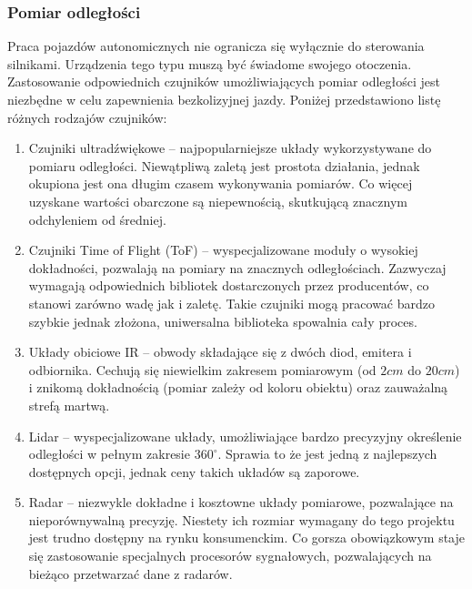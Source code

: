         \subsubsection{Pomiar odległości}
            Praca pojazdów autonomicznych nie ogranicza się wyłącznie do sterowania silnikami.
            Urządzenia tego typu muszą być świadome swojego otoczenia.
            Zastosowanie odpowiednich czujników umożliwiających pomiar odległości jest niezbędne w celu zapewnienia bezkolizyjnej jazdy.
            Poniżej przedstawiono listę różnych rodzajów czujników:
            \begin{enumerate}
                \item Czujniki ultradźwiękowe -- najpopularniejsze układy wykorzystywane do pomiaru odległości.
                Niewątpliwą zaletą jest prostota działania, jednak okupiona jest ona długim czasem wykonywania pomiarów.
                Co więcej uzyskane wartości obarczone są niepewnością, skutkującą znacznym odchyleniem od średniej.
                \item Czujniki Time of Flight (ToF) -- wyspecjalizowane moduły o wysokiej dokładności, pozwalają na pomiary na znacznych odległościach.
                Zazwyczaj wymagają odpowiednich bibliotek dostarczonych przez producentów, co stanowi zarówno wadę jak i zaletę.
                Takie czujniki mogą pracować bardzo szybkie jednak złożona, uniwersalna biblioteka spowalnia cały proces.
                \item Układy obiciowe IR -- obwody składające się z dwóch diod, emitera i odbiornika.
                Cechują się niewielkim zakresem pomiarowym (od $2cm$ do $20cm$) i znikomą dokładnością (pomiar zależy od koloru obiektu) oraz zauważalną strefą martwą.
                \item Lidar -- wyspecjalizowane układy, umożliwiające bardzo precyzyjny określenie odległości w pełnym zakresie $360^\circ$.
                Sprawia to że jest jedną z najlepszych dostępnych opcji, jednak ceny takich układów są zaporowe.
                \item Radar -- niezwykle dokładne i kosztowne układy pomiarowe, pozwalające na nieporównywalną precyzję.
                Niestety ich rozmiar wymagany do tego projektu jest trudno dostępny na rynku konsumenckim.
                Co gorsza obowiązkowym staje się zastosowanie specjalnych procesorów sygnałowych, pozwalających na bieżąco przetwarzać dane z radarów.
            \end{enumerate}
